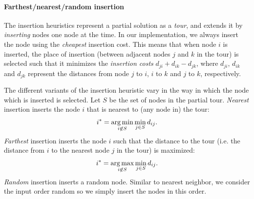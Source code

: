 \paragraph{Farthest/nearest/random insertion}
The insertion heuristics represent a partial solution as a \emph{tour}, and extends it by \emph{inserting} nodes one node at the time. In our implementation, we always insert the node using the \emph{cheapest} insertion cost. This means that when node $i$ is inserted, the place of insertion (between adjacent nodes $j$ and $k$ in the tour) is selected such that it minimizes the \emph{insertion costs} $d_{ji} + d_{ik} - d_{jk}$, where $d_{ji}$, $d_{ik}$ and $d_{jk}$ represent the distances from node $j$ to $i$, $i$ to $k$ and $j$ to $k$, respectively.

The different variants of the insertion heuristic vary in the way in which the node which is inserted is selected. Let $S$ be the set of nodes in the partial tour. \emph{Nearest} insertion inserts the node $i$ that is nearest to (any node in) the tour:
\begin{equation}
	i^* = \operatorname*{arg\,min}_{i \not \in S} \min_{j \in S} d_{ij}.
\end{equation}
\emph{Farthest} insertion inserts the node $i$ such that the distance to the tour (i.e. the distance from $i$ to the nearest node $j$ in the tour) is maximized:
\begin{equation}
	i^* = \operatorname*{arg\,max}_{i \not \in S} \min_{j \in S} d_{ij}.
\end{equation}
\emph{Random} insertion inserts a random node. Similar to nearest neighbor, we consider the input order random so we simply insert the nodes in this order.

